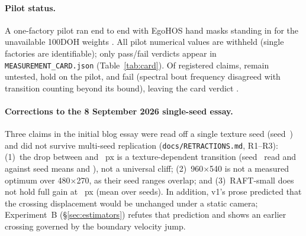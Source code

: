 \documentclass[11pt]{article}
\begin{document}
\paragraph{Pilot status.}
A one-factory pilot ran end to end with EgoHOS hand masks \citep{zhang2022egohos} standing in for
the unavailable 100DOH weights \citep{shan2020hands}. All pilot numerical values are withheld
(single factories are identifiable); only pass/fail verdicts appear in
\texttt{MEASUREMENT\_CARD.json} (Table~\ref{tab:card}). Of \cgCardClaims{} registered claims,
\cgCardUntested{} remain untested, \cgCardHolds{} hold on the pilot, and \cgCardFailed{} fail
(spectral bout frequency disagreed with transition counting beyond its bound), leaving the card
verdict \cgCardVerdict{}.

\begin{table}[t]
\centering\small

\caption{Pre-registered claims and recorded pilot status from \texttt{MEASUREMENT\_CARD.json}
(overall verdict: \cgCardVerdict{}). Pilot numerical values are withheld.}
\label{tab:card}
\end{table}

\paragraph{Corrections to the 8 September 2026 single-seed essay.}
Three claims in the initial blog essay \citep{theodoro2026essay} were read off a single texture
seed (seed~\cgPubSeed{}) and did not survive multi-seed replication (\texttt{docs/RETRACTIONS.md},
R1--R3): (1)~the drop between \cgDispKnee{} and \cgDispAfter{}~px is a texture-dependent transition
(seed~\cgPubSeed{} read \cgGainAtKneePub{} and \cgGainAfterPub{} against seed means
\cgGainAtKneeMean{} and \cgGainAfterMean{}), not a universal cliff; (2)~960$\times$540 is not a
measured optimum over 480$\times$270, as their seed ranges overlap; and (3)~RAFT-small does not
hold full gain at \cgDispAfter{}~px (mean \cgRaftAfterMean{} over \cgNSeedsRaft{} seeds). In
addition, v1's prose predicted that the crossing displacement would be unchanged under a static
camera; Experiment~B (\S\ref{sec:estimators}) refutes that prediction and shows an earlier crossing
governed by the boundary velocity jump.
\end{document}

